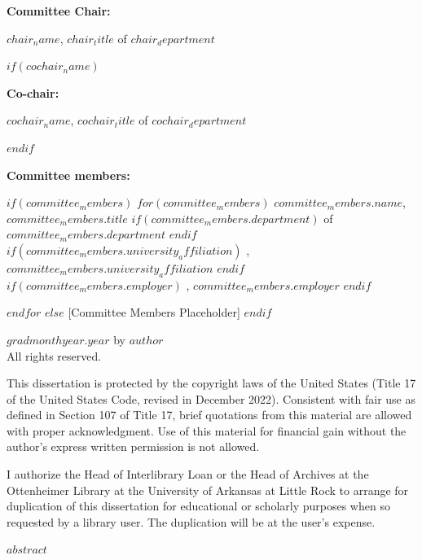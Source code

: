 \documentclass[$if(font_size)$$font_size$$else$12pt$endif$]{book}
\newcommand{\authorname}{$author$}
\newcommand{\authorname}{[Author Placeholder]}
\newcommand{\submissiontype}{dissertation}
\newcommand{\submissiontype}{thesis}
\newcommand{\submissiontype}{thesis}
\newcommand{\submissiontype}{[Submission Type Placeholder]}
\newcommand{\gradyear}{$gradmonthyear.year$}
\newcommand{\gradyear}{[Year]}
\newcommand{\chairname}{$chair_name$}
\newcommand{\chairname}{[Chair Name]}
\newcommand{\chairtitle}{$chair_title$}
\newcommand{\chairtitle}{[Chair Title]}
\newcommand{\chairdepartment}{$chair_department$}
\newcommand{\chairdepartment}{[Chair Department]}
\newcommand{\cochairname}{$cochair_name$}
\newcommand{\cochairname}{}
\newcommand{\cochairtitle}{$cochair_title$}
\newcommand{\cochairtitle}{}
\newcommand{\cochairdepartment}{$cochair_department$}
\newcommand{\cochairdepartment}{}
\newcommand{\committeemembers}{
$if(committee_members)$
$for(committee_members)$
\noindent $committee_members.name$, $committee_members.title$%
$if(committee_members.department)$
{} of $committee_members.department$%
$endif$
$if(committee_members.university_affiliation)$
, $committee_members.university_affiliation$%
$endif$
$if(committee_members.employer)$
, $committee_members.employer$%
$endif$
\par
$endfor$
$else$
[Committee Members Placeholder]
$endif$
}
\begin{document}
\begin{titlepage}
\begin{flushleft}
        {\normalsize\bfseries\sffamily Committee Chair: \par}
        \chairname, \chairtitle{} of \chairdepartment \par
        $if(cochair_name)$
        {\normalsize\bfseries\sffamily Co-chair: \par}
        \cochairname, \cochairtitle{} of \cochairdepartment \par
        $endif$
        \vspace{1cm}
        {\normalsize\bfseries\sffamily Committee members: \par}
        \committeemembers
    \end{flushleft}
\end{titlepage}

\newpage
\thispagestyle{fancy}
\setcounter{page}{2}
\begin{flushleft}
    \singlespacing
    \textcopyright{} \gradyear{} by \authorname \\
    All rights reserved. \\
    \vspace{1.5cm}
    {\large\bfseries{} \par}
    \vspace{.5cm}
    This \submissiontype{} is protected by the copyright laws of the United States (Title 17 of the United States Code, revised in December 2022). Consistent with fair use as defined in Section 107 of Title 17, brief quotations from this material are allowed with proper acknowledgment. Use of this material for financial gain without the author’s express written permission is not allowed. \\
    \vspace{1.5cm}
    {\large\bfseries{} \par}
    \vspace{.5cm}
    I authorize the Head of Interlibrary Loan or the Head of Archives at the Ottenheimer Library at the University of Arkansas at Little Rock to arrange for duplication of this \submissiontype{} for educational or scholarly purposes when so requested by a library user. The duplication will be at the user’s expense.
\end{flushleft}

\newpage
\thispagestyle{fancy}
\begin{flushleft}
    {\large\bfseries{} \par}
    \vspace{.5cm}
    \doublespacing
    $abstract$
\end{flushleft}
\end{document}
